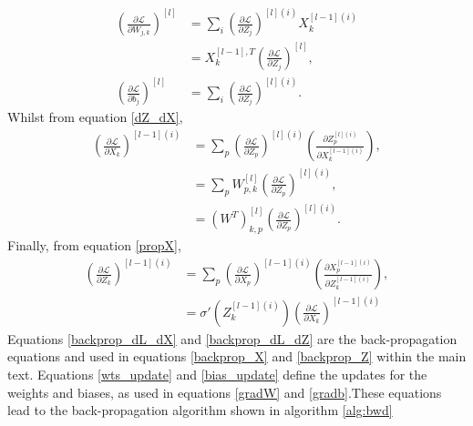 \documentclass[nohyperref]{article}
\theoremstyle{plain}
\theoremstyle{definition}
\theoremstyle{remark}
\begin{document}
\begin{align}
\left(\frac{\partial \mathcal{L}}{\partial W_{j,k}}\right)^{[l]}&=\sum_{i}\left(\frac{\partial \mathcal{L}}{\partial Z_{j}}\right)^{[l](i)}X_{k}^{[l-1](i)}\nonumber\\
&=X_{k}^{[l-1],T}\left(\frac{\partial \mathcal{L}}{\partial Z_{j}}\right)^{[l]},\label{wts_update}\\
\left(\frac{\partial \mathcal{L}}{\partial b_{j}}\right)^{[l]}&=\sum_{i}\left(\frac{\partial \mathcal{L}}{\partial Z_{j}}\right)^{[l](i)}\label{bias_update}.
\end{align}
Whilst from equation \ref{dZ_dX},
\begin{align}
\left(\frac{\partial \mathcal{L}}{\partial X_{k}}\right)^{[l-1](i)}&=\sum_{p}\left(\frac{\partial \mathcal{L}}{\partial Z_{p}}\right)^{[l](i)}\left(\frac{\partial Z_{p}^{[l](i)}}{\partial X_{k}^{[l-1](i)}}\right),\nonumber\\
&=\sum_{p} W_{p,k}^{[l]}\left(\frac{\partial \mathcal{L}}{\partial Z_{p}}\right)^{[l](i)},\nonumber\\
&=\left(W^{T}\right)_{k,p}^{[l]}\left(\frac{\partial \mathcal{L}}{\partial Z_{p}}\right)^{[l](i)}\label{backprop_dL_dX}.
\end{align}
Finally, from equation \ref{propX},
\begin{align}
\left(\frac{\partial \mathcal{L}}{\partial Z_{k}}\right)^{[l-1](i)}&=\sum_{p}\left(\frac{\partial \mathcal{L}}{\partial X_{p}}\right)^{[l-1](i)}\left(\frac{\partial X_{p}^{[l-1](i)}}{\partial Z_{k}^{[l-1](i)}}\right),\nonumber\\
&= \sigma'{(Z_{k}^{[l-1](i)})}\left(\frac{\partial \mathcal{L}}{\partial X_{k}}\right)^{[l-1](i)}\label{backprop_dL_dZ}
\end{align}
Equations \ref{backprop_dL_dX} and \ref{backprop_dL_dZ} are the back-propagation equations and used in equations \ref{backprop_X} and \ref{backprop_Z} within the main text. Equations \ref{wts_update} and \ref{bias_update} define the updates for the weights and biases, as used in equations \ref{gradW} and \ref{gradb}.These equations lead to the back-propagation algorithm shown in algorithm \ref{alg:bwd} 

\onecolumn
\end{document}
